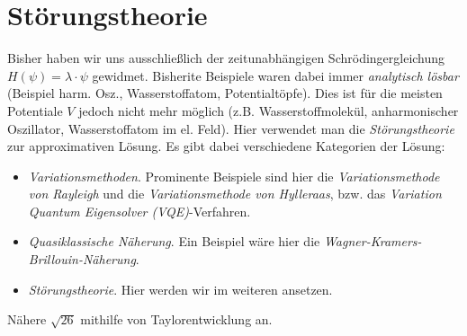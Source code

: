 \documentclass{subfiles}
\begin{document}
    \section{Störungstheorie}
        Bisher haben wir uns ausschließlich der zeitunabhängigen Schrödingergleichung $H(\psi) = \lambda\cdot\psi$ gewidmet. Bisherite Beispiele waren dabei immer \emph{analytisch lösbar} (Beispiel harm. Osz., Wasserstoffatom, Potentialtöpfe). Dies ist für die meisten Potentiale $V$ jedoch nicht mehr möglich (z.B. Wasserstoffmolekül, anharmonischer Oszillator, Wasserstoffatom im el. Feld). Hier verwendet man die \emph{Störungstheorie} zur approximativen Lösung. Es gibt dabei verschiedene Kategorien der Lösung:
        \begin{itemize}[$\to$]
            \item \emph{Variationsmethoden}. Prominente Beispiele sind hier die \emph{Variationsmethode von Rayleigh} und die \emph{Variationsmethode von Hylleraas}, bzw. das \emph{Variation Quantum Eigensolver (VQE)}-Verfahren.
            \item \emph{Quasiklassische Näherung}. Ein Beispiel wäre hier die \textit{Wagner-Kramers-Brillouin-Näherung}.
            \item \emph{Störungstheorie}. Hier werden wir im weiteren ansetzen. 
        \end{itemize}
        \begin{Aufgabe}
            \nr{} Nähere $\sqrt{26}$ mithilfe von Taylorentwicklung an. 
        \end{Aufgabe}
\end{document}
